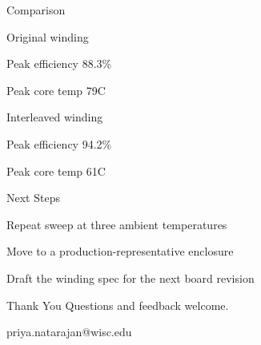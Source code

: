 \documentclass{uwmslide}
\begin{document}
\begin{doubleitem}{Comparison}
\item Original winding
\item Peak efficiency 88.3\%
\item Peak core temp 79\textdegree C
\slidedivider
\item Interleaved winding
\item Peak efficiency 94.2\%
\item Peak core temp 61\textdegree C
\end{doubleitem}

\begin{itemslide}{Next Steps}
\item Repeat sweep at three ambient temperatures
\item Move to a production-representative enclosure
\item Draft the winding spec for the next board revision
\end{itemslide}

\begin{slide}{Thank You}
Questions and feedback welcome.

\medskip
priya.natarajan@wisc.edu
\end{slide}
\end{document}
